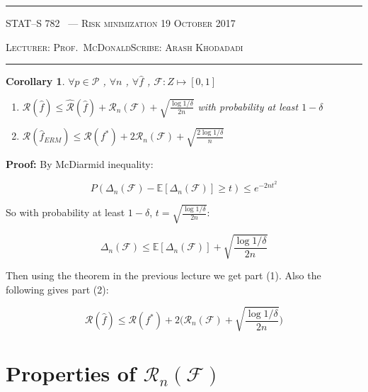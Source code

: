 \documentclass[10pt]{article}
\newcounter{lecnum}
\newtheorem{corollary}[cor]{Corollary}
\renewcommand{\hat}{\widehat}
\newcommand{\lecturer}{Prof.\ McDonald}
\newcommand{\scribe}{Arash Khodadadi}
\newcommand{\chtitle}{Risk minimization}
\newcommand{\lecdate}{19 October 2017}
\begin{document}
\rule{6.5in}{1pt}

\textsc{STAT--S 782
        \hfill \thelecnum\ --- \chtitle
        \hfill \lecdate}

\textsc{Lecturer: \lecturer \hfill Scribe: \scribe}
\rule{6.5in}{1pt}


\begin{corollary}
	\label{thm:convergence-1}
	$\forall p \in \mathcal{P}$ , $\forall n$ , $\forall \hat{f}$ , $\mathcal{F}: Z\longmapsto [0,1]$ 
	
	  \begin{enumerate}
		\item [(1)] $\mathcal{R}(\hat{f}) \le \hat{\mathcal{R}}(\hat{f})+\mathcal{R}_n(\mathcal{F})+\sqrt{\frac{\log 1/\delta}{2n}}$ with probability at least $1-\delta$
		\item [(2)] $\mathcal{R}(\hat{f}_{ERM}) \le \mathcal{R}(f^*)+2\mathcal{R}_n(\mathcal{F})+\sqrt{\frac{2\log 1/\delta}{n}}$
	\end{enumerate}
\end{corollary}

\textbf{Proof:}
By McDiarmid inequality:

\begin{equation}
P(\Delta_n(\mathcal{F})-\mathbb{E}[\Delta_n(\mathcal{F})] \ge t) \le e^{-2nt^2}
\end{equation}

So with probability at least $1-\delta$, $t=\sqrt{\frac{\log 1/\delta}{2n}}$:

\begin{equation}
\Delta_n(\mathcal{F}) \le \mathbb{E}[\Delta_n(\mathcal{F})] + \sqrt{\frac{\log 1/\delta}{2n}}
\end{equation}

Then using the theorem in the previous lecture we get part (1). Also the following gives part (2):

\begin{equation}
\mathcal{R}(\hat{f}) \le \mathcal{R}(f^*)+2\bigg(\mathcal{R}_n(\mathcal{F})+\sqrt{\frac{\log 1/\delta}{2n}}\bigg)
\end{equation}

\section{Properties of $\mathcal{R}_n(\mathcal{F})$}
\end{document}
